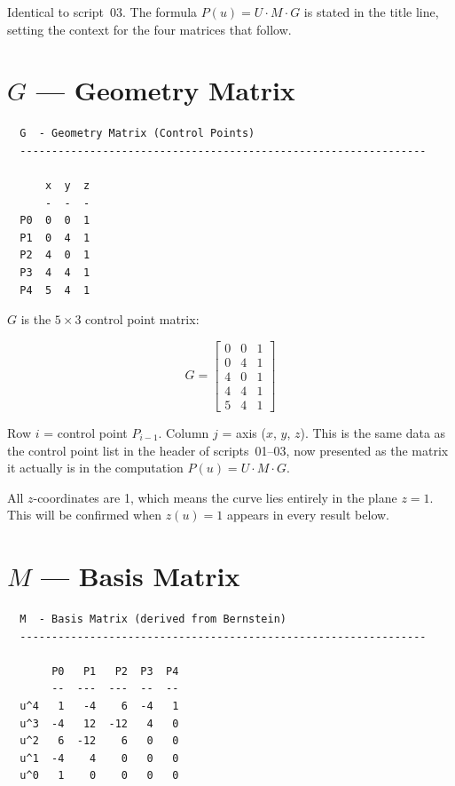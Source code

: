 \documentclass[12pt, a4paper]{article}
\begin{document}
Identical to script~03.
The formula $P(u) = U \cdot M \cdot G$ is stated in the
title line, setting the context for the four matrices
that follow.


\section{$G$ --- Geometry Matrix}

\begin{verbatim}
  G  - Geometry Matrix (Control Points)
  ----------------------------------------------------------------

      x  y  z
      -  -  -
  P0  0  0  1
  P1  0  4  1
  P2  4  0  1
  P3  4  4  1
  P4  5  4  1
\end{verbatim}

$G$ is the $5 \times 3$ control point matrix:

\[
  G = \begin{bmatrix}
    0 & 0 & 1 \\
    0 & 4 & 1 \\
    4 & 0 & 1 \\
    4 & 4 & 1 \\
    5 & 4 & 1
  \end{bmatrix}
\]

Row $i$ = control point $P_{i-1}$.
Column $j$ = axis ($x$, $y$, $z$).
This is the same data as the control point list in the
header of scripts~01--03, now presented as the matrix
it actually is in the computation $P(u) = U \cdot M \cdot G$.

All $z$-coordinates are 1, which means the curve lies
entirely in the plane $z = 1$. This will be confirmed
when $z(u) = 1$ appears in every result below.


\section{$M$ --- Basis Matrix}

\begin{verbatim}
  M  - Basis Matrix (derived from Bernstein)
  ----------------------------------------------------------------

       P0   P1   P2  P3  P4
       --  ---  ---  --  --
  u^4   1   -4    6  -4   1
  u^3  -4   12  -12   4   0
  u^2   6  -12    6   0   0
  u^1  -4    4    0   0   0
  u^0   1    0    0   0   0
\end{verbatim}
\end{document}
